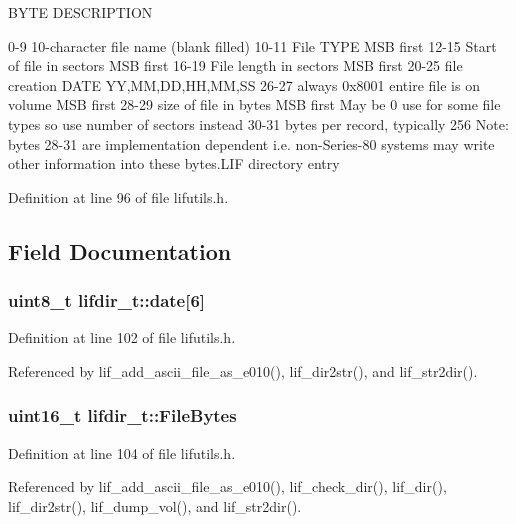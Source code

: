B\+Y\+TE D\+E\+S\+C\+R\+I\+P\+T\+I\+ON 

 0-\/9 10-\/character file name (blank filled) 10-\/11 File T\+Y\+PE M\+SB first 12-\/15 Start of file in sectors M\+SB first 16-\/19 File length in sectors M\+SB first 20-\/25 file creation D\+A\+TE YY,MM,DD,HH,MM,SS 26-\/27 always 0x8001 entire file is on volume M\+SB first 28-\/29 size of file in bytes M\+SB first May be 0 use for some file types so use number of sectors instead 30-\/31 bytes per record, typically 256 Note\+: bytes 28-\/31 are implementation dependent i.\+e. non-\/\+Series-\/80 systems may write other information into these bytes.\+L\+IF directory entry 

Definition at line 96 of file lifutils.\+h.



\subsection{Field Documentation}
\subsubsection[{\texorpdfstring{date}{date}}]{\setlength{\rightskip}{0pt plus 5cm}uint8\+\_\+t lifdir\+\_\+t\+::date\mbox{[}6\mbox{]}}\hypertarget{structlifdir__t_afb6d03670642d3bf86f460ae246ceb0b}{}\label{structlifdir__t_afb6d03670642d3bf86f460ae246ceb0b}


Definition at line 102 of file lifutils.\+h.



Referenced by lif\+\_\+add\+\_\+ascii\+\_\+file\+\_\+as\+\_\+e010(), lif\+\_\+dir2str(), and lif\+\_\+str2dir().

\subsubsection[{\texorpdfstring{File\+Bytes}{FileBytes}}]{\setlength{\rightskip}{0pt plus 5cm}uint16\+\_\+t lifdir\+\_\+t\+::\+File\+Bytes}\hypertarget{structlifdir__t_a6e2414bf7966358862b59c5eaf3903f2}{}\label{structlifdir__t_a6e2414bf7966358862b59c5eaf3903f2}


Definition at line 104 of file lifutils.\+h.



Referenced by lif\+\_\+add\+\_\+ascii\+\_\+file\+\_\+as\+\_\+e010(), lif\+\_\+check\+\_\+dir(), lif\+\_\+dir(), lif\+\_\+dir2str(), lif\+\_\+dump\+\_\+vol(), and lif\+\_\+str2dir().

